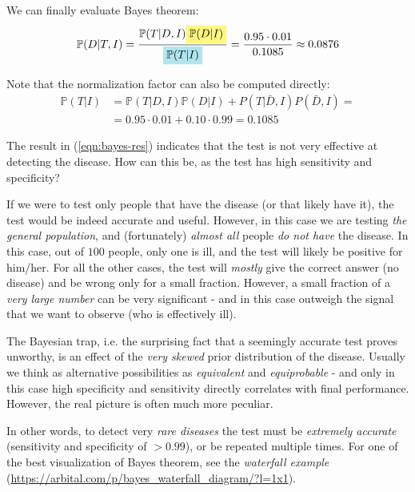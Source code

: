 \documentclass[../template.tex]{subfiles}
\begin{document}
\begin{exo}
\begin{table}[H]
\begin{tabular}{@{}r|ll|c@{}}
        \end{tabular}
    \end{table}

    We can finally evaluate Bayes theorem:
    \begin{align} \label{eqn:bayes-res}
        \mathbb{P}(D|T,I) = \frac{\mathbb{P}(T|D,I) \hlc{Yellow}{\mathbb{P}(D|I)}}{\hlc{SkyBlue}{\mathbb{P}(T|I)}} = \frac{0.95 \cdot 0.01}{0.1085} \approx 0.0876 
    \end{align}

    Note that the normalization factor can also be computed directly:
    \begin{align*}
        \mathbb{P}(T|I) &= \mathbb{P}(T|D,I) \mathbb{P}(D|I) + P(T|\bar{D},I)P(\bar{D},I) =\\
        &= 0.95 \cdot 0.01 + 0.10 \cdot 0.99 = 0.1085
    \end{align*}

    The result in (\ref{eqn:bayes-res}) indicates that the test is not very effective at detecting the disease. How can this be, as the test has high sensitivity and specificity?
    \medskip

    If we were to test only people that have the disease (or that likely have it), the test would be indeed accurate and useful. However, in this case we are testing \textit{the general population}, and (fortunately) \textit{almost all} people \textit{do not have} the disease. In this case, out of $100$ people, only one is ill, and the test will likely be positive for him/her. For all the other cases, the test will \textit{mostly} give the correct answer (no disease) and be wrong only for a small fraction. However, a small fraction of a \textit{very large number} can be very significant - and in this case outweigh the signal that we want to observe (who is effectively ill).

    \medskip

    The Bayesian trap, i.e. the surprising fact that a seemingly accurate test proves unworthy, is an effect of the \textit{very skewed} prior distribution of the disease. Usually we think as alternative possibilities as \textit{equivalent} and \textit{equiprobable} - and only in this case high specificity and sensitivity directly correlates with final performance. However, the real picture is often much more peculiar.
    \medskip

    In other words, to detect very \textit{rare diseases} the test must be \textit{extremely accurate} (sensitivity and specificity of $>0.99$), or be repeated multiple times.  For one of the best visualization of Bayes theorem, see the \textit{waterfall example} (\url{https://arbital.com/p/bayes_waterfall_diagram/?l=1x1}). 
\end{exo}
\end{document}
